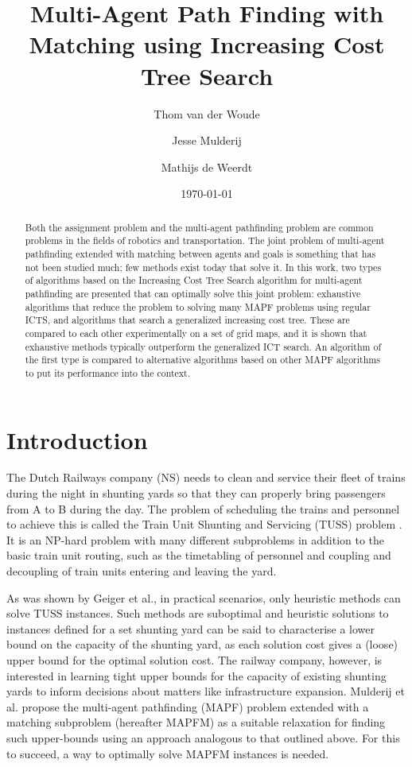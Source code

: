 \documentclass[english,10pt]{article}
\begin{document}
	
	\title{Multi-Agent Path Finding with Matching using Increasing Cost Tree Search}
	
	\author{Thom van der Woude\and Jesse Mulderij\and Mathijs de Weerdt}
	\date{\today}
	
	\maketitle
	
	\begin{abstract}
		Both the assignment problem and the multi-agent pathfinding problem are common problems in the fields of robotics and transportation. The joint problem of multi-agent pathfinding extended with matching between agents and goals is something that has not been studied much; few methods exist today that solve it. In this work, two types of algorithms based on the Increasing Cost Tree Search algorithm for multi-agent pathfinding are presented that can optimally solve this joint problem: exhaustive algorithms that reduce the problem to solving many MAPF problems using regular ICTS, and algorithms that search a generalized increasing cost tree. These are compared to each other experimentally on a set of grid maps, and it is shown that exhaustive methods typically outperform the generalized ICT search. An algorithm of the first type is compared to alternative algorithms based on other MAPF algorithms to put its performance into the context.
	\end{abstract}
	
	\section{Introduction}
	The Dutch Railways company (NS) needs to clean and service their fleet of trains during the night in shunting yards so that they can properly bring passengers from A to B during the day. 
	The problem of scheduling the trains and personnel to achieve this is called the Train Unit Shunting and Servicing (TUSS) problem \cite{mulderij2020}. 
	It is an NP-hard problem with many different subproblems in addition to the basic train unit routing, such as the timetabling of personnel and coupling and decoupling of train units entering and leaving the yard. %
	
	As was shown by Geiger et al.\cite{geiger2018}, in practical scenarios, only heuristic methods can solve TUSS instances. 
	Such methods are suboptimal and heuristic solutions to instances defined for a set shunting yard can be said to characterise a lower bound on the capacity of the shunting yard, as each solution cost gives a (loose) upper bound for the optimal solution cost. 
	The railway company, however, is interested in learning tight upper bounds for the capacity of existing shunting yards to inform decisions about matters like infrastructure expansion. 
	Mulderij et al. \cite{mulderij2020} propose the multi-agent pathfinding (MAPF) problem \cite{stern2019} extended with a matching subproblem (hereafter MAPFM) as a suitable relaxation for finding such upper-bounds using an approach analogous to that outlined above.
	For this to succeed, a way to optimally solve MAPFM instances is needed.
	
\end{document}
